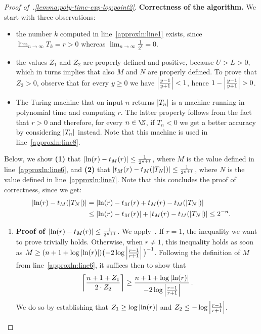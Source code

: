 \begin{proof}[Proof of~.\ref{lemma:poly-time-exp-log:point2}]
  \noindent
  \textbf{Correctness of the algorithm.}
  We start with three observations:
  \begin{itemize}
    \item the number $k$ computed in line~\ref{approxln:line1} exists, since
      $\lim_{n \to \infty} T_k = r > 0$ whereas $\lim_{n \to \infty}
      \frac{1}{2^k} = 0$.  
    \item the values $Z_1$ and $Z_2$ are properly defined and positive, because $U > L > 0$, which in turns implies that also $M$ and $N$ are properly defined. 
    To prove that $Z_2 > 0$, observe that for every $y \geq 0$ we have $\left|\frac{y-1}{y+1}\right| < 1$, hence $1 - \left|\frac{y-1}{y+1}\right| > 0$.
    \item The Turing machine that on input $n$ returns $\left|T_n\right|$ is a machine
    running in polynomial time and computing $r$. The latter property follows
    from the fact that $r > 0$ and therefore, for every $n \in \N$, if $T_n < 0$
    we get a better accuracy by considering $\left|T_n\right|$ instead. 
    Note that this machine is used in line~\ref{approxln:line8}.
  \end{itemize}
  Below, we show \textbf{(1)} that $\left|\ln(r)-t_M(r)\right| \leq \frac{1}{2^{n+1}}$,
  where $M$ is the value defined in line~\ref{approxln:line6}, 
  and \textbf{(2)} that $\left|t_M(r)-t_M(\left|T_N\right|)\right| \leq \frac{1}{2^{n+1}}$, 
  where $N$ is the value defined in line~\ref{approxln:line7}.
  Note that this concludes the proof of correctness, since we get: 
  \begin{align*}
    \abs{\ln(r)-t_M(\abs{T_N})} &= \abs{\ln(r)-t_M(r)+t_M(r)-t_M(\abs{T_N})}\\
    &\leq \abs{\ln(r)-t_M(r)}+ \abs{t_M(r)-t_M(\abs{T_N})} 
    \leq  2^{-n}.%
  \end{align*}
  \begin{enumerate}
    \item \textbf{Proof of $\left|\ln(r)-t_M(r)\right| \leq \frac{1}{2^{n+1}}$.} 
      We apply~. If $r = 1$, the inequality we want to prove trivially holds. Otherwise, when $r \neq 1$, 
      this inequality holds as soon as $M \geq
      (n+1+\log\left|\ln(r)\right|) \big({-}2\log\left|\frac{r-1}{r+1}\right|\big)^{-1}$.
      Following the definition of $M$ from line~\ref{approxln:line6}, 
      it suffices then to show that 
      \[ 
        \left\lceil\frac{n+1+Z_1}{2 \cdot Z_2}\right\rceil \geq \frac{n+1+\log\left|\ln(r)\right|}{{-}2\log\left|\frac{r-1}{r+1}\right|}\,.
      \]
      We do so by establishing that $Z_1 \geq \log\left|\ln(r)\right|$ and $Z_2 \leq -\log\left|\frac{r-1}{r+1}\right|$. 

\end{enumerate}
\end{proof}
